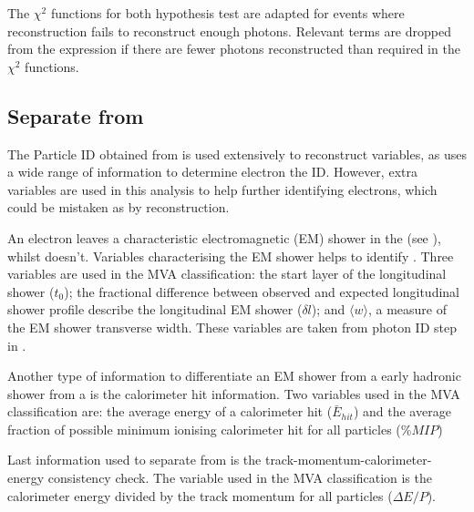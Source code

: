 
The $\chi^{2}$ functions for both hypothesis test are adapted for events where reconstruction fails to reconstruct enough photons. Relevant terms are dropped from the expression if there are fewer photons reconstructed  than required in the $\chi^{2}$ functions.

\subsection{Separate \decayElectronShort from \decayPionShort}

The Particle ID obtained from \pandora is used extensively to reconstruct variables, as \pandora uses a wide range of information to determine electron the ID. However, extra variables are used in this analysis to help further identifying electrons, which could be mistaken as \Pgpm by \pandora reconstruction.

An electron leaves a characteristic electromagnetic  (EM) shower in the \ECAL (see ), whilst \Pgpm doesn't. Variables characterising the  EM shower helps to identify \Pem. Three variables are used in the MVA classification: the start layer of the longitudinal shower ($t_0$); the fractional difference between observed and expected longitudinal shower profile describe the longitudinal EM shower ($\delta{l}$); and $\langle{w}\rangle$, a measure of the EM shower transverse width. These variables are  taken from photon ID step in .

Another type of information to differentiate an EM shower from a early hadronic shower from a \Pgpm is the calorimeter hit information. Two variables used in the MVA classification are: the average energy of a calorimeter hit ($\bar{E}_{hit}$) and the average fraction of possible minimum ionising calorimeter hit for all particles ($\%MIP$)

Last information used to separate \Pem from \Pgpm is the track-momentum-calorimeter-energy consistency check. The variable used in the MVA classification is the calorimeter energy divided by the track momentum for all particles ($\Delta E/P$).




